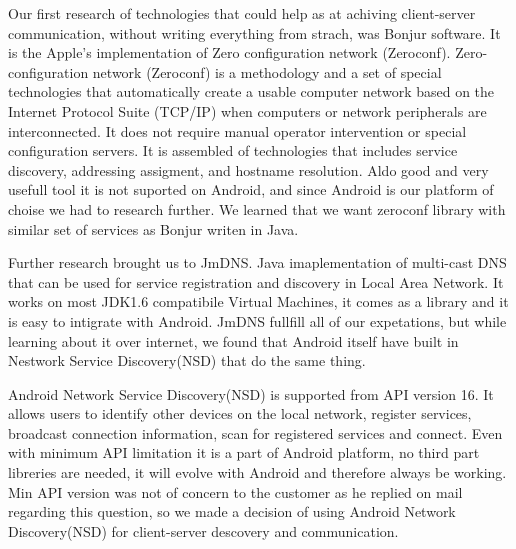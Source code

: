 Our first research of technologies that could help as at achiving client-server communication, without writing everything from strach, was Bonjur software. 
It is the Apple's implementation of Zero configuration network (Zeroconf). 
Zero-configuration network (Zeroconf)  is a methodology and a set of special technologies that automatically create a usable computer network based on the Internet Protocol Suite (TCP/IP) when computers or network peripherals are interconnected. 
It does not require manual operator intervention or special configuration servers.
It is assembled of technologies that includes service discovery, addressing assigment, and hostname resolution.
Aldo good and very usefull tool it is not suported on Android, and since Android is our platform of choise we had to research further. 
We learned that we want zeroconf library with similar set of services as Bonjur writen in Java.


Further research brought us to JmDNS. Java imaplementation of multi-cast DNS that can be used for service registration and discovery in Local Area Network. 
It works on most JDK1.6 compatibile Virtual Machines, it comes as a library and it is easy to intigrate with Android. 
JmDNS fullfill all of our expetations, but while learning about it over internet, we found that Android itself have built in Nestwork Service Discovery(NSD) that do the same thing.


Android Network Service Discovery(NSD) is supported from API version 16. 
It allows users to identify other devices on the local network, register services, broadcast connection information, scan for registered services and connect.
Even with minimum API limitation it is a part of Android platform, no third part libreries are needed, it will evolve with Android and therefore always be working.
Min API version was not of concern to the customer as he replied on mail regarding this question, so we made a decision of using Android Network Discovery(NSD) for client-server descovery and communication.

